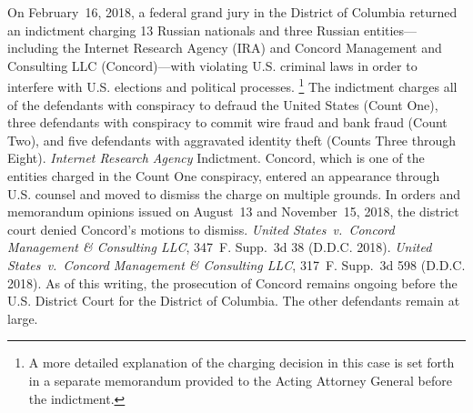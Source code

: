 On February~16, 2018, a federal grand jury in the District of Columbia returned an indictment charging 13 Russian nationals and three Russian entities---including the Internet Research Agency (IRA) and Concord Management and Consulting LLC (Concord)---with violating U.S. criminal laws in order to interfere with U.S. elections and political processes.%
\footnote{A more detailed explanation of the charging decision in this case is set forth in a separate memorandum provided to the Acting Attorney General before the indictment.}
The indictment charges all of the defendants with conspiracy to defraud the United States (Count One), three defendants with conspiracy to commit wire fraud and bank fraud (Count Two), and five defendants with aggravated identity theft (Counts Three through Eight).
\textit{Internet Research Agency} Indictment.
Concord, which is one of the entities charged in the Count One conspiracy, entered an appearance through U.S. counsel and moved to dismiss the charge on multiple grounds.
In orders and memorandum opinions issued on August~13 and November~15, 2018, the district court denied Concord's motions to dismiss.
\textit{United States~v.\ Concord Management \& Consulting LLC}, 347~F. Supp.~3d 38 (D.D.C. 2018).
\textit{United States~v.\ Concord Management \& Consulting LLC}, 317~F. Supp.~3d 598 (D.D.C. 2018).
As of this writing, the prosecution of Concord remains ongoing before the U.S. District Court for the District of Columbia.
The other defendants remain at large.


